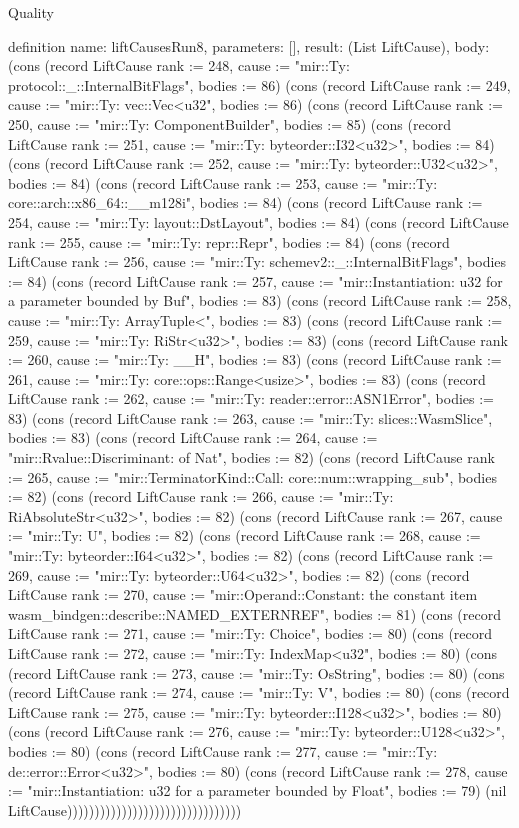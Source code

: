 \begin{lexlean}{Quality}
\begin{semanticmodule}
definition{
  name: liftCausesRun8,
  parameters: [],
  result: (List LiftCause),
  body: (cons (record LiftCause {rank := 248, cause := "mir::Ty: protocol::_::InternalBitFlags", bodies := 86}) (cons (record LiftCause {rank := 249, cause := "mir::Ty: vec::Vec<u32", bodies := 86}) (cons (record LiftCause {rank := 250, cause := "mir::Ty: ComponentBuilder", bodies := 85}) (cons (record LiftCause {rank := 251, cause := "mir::Ty: byteorder::I32<u32>", bodies := 84}) (cons (record LiftCause {rank := 252, cause := "mir::Ty: byteorder::U32<u32>", bodies := 84}) (cons (record LiftCause {rank := 253, cause := "mir::Ty: core::arch::x86_64::__m128i", bodies := 84}) (cons (record LiftCause {rank := 254, cause := "mir::Ty: layout::DstLayout", bodies := 84}) (cons (record LiftCause {rank := 255, cause := "mir::Ty: repr::Repr", bodies := 84}) (cons (record LiftCause {rank := 256, cause := "mir::Ty: schemev2::_::InternalBitFlags", bodies := 84}) (cons (record LiftCause {rank := 257, cause := "mir::Instantiation: u32 for a parameter bounded by Buf", bodies := 83}) (cons (record LiftCause {rank := 258, cause := "mir::Ty: ArrayTuple<", bodies := 83}) (cons (record LiftCause {rank := 259, cause := "mir::Ty: RiStr<u32>", bodies := 83}) (cons (record LiftCause {rank := 260, cause := "mir::Ty: __H", bodies := 83}) (cons (record LiftCause {rank := 261, cause := "mir::Ty: core::ops::Range<usize>", bodies := 83}) (cons (record LiftCause {rank := 262, cause := "mir::Ty: reader::error::ASN1Error", bodies := 83}) (cons (record LiftCause {rank := 263, cause := "mir::Ty: slices::WasmSlice", bodies := 83}) (cons (record LiftCause {rank := 264, cause := "mir::Rvalue::Discriminant: of Nat", bodies := 82}) (cons (record LiftCause {rank := 265, cause := "mir::TerminatorKind::Call: core::num::wrapping_sub", bodies := 82}) (cons (record LiftCause {rank := 266, cause := "mir::Ty: RiAbsoluteStr<u32>", bodies := 82}) (cons (record LiftCause {rank := 267, cause := "mir::Ty: U", bodies := 82}) (cons (record LiftCause {rank := 268, cause := "mir::Ty: byteorder::I64<u32>", bodies := 82}) (cons (record LiftCause {rank := 269, cause := "mir::Ty: byteorder::U64<u32>", bodies := 82}) (cons (record LiftCause {rank := 270, cause := "mir::Operand::Constant: the constant item wasm_bindgen::describe::NAMED_EXTERNREF", bodies := 81}) (cons (record LiftCause {rank := 271, cause := "mir::Ty: Choice", bodies := 80}) (cons (record LiftCause {rank := 272, cause := "mir::Ty: IndexMap<u32", bodies := 80}) (cons (record LiftCause {rank := 273, cause := "mir::Ty: OsString", bodies := 80}) (cons (record LiftCause {rank := 274, cause := "mir::Ty: V", bodies := 80}) (cons (record LiftCause {rank := 275, cause := "mir::Ty: byteorder::I128<u32>", bodies := 80}) (cons (record LiftCause {rank := 276, cause := "mir::Ty: byteorder::U128<u32>", bodies := 80}) (cons (record LiftCause {rank := 277, cause := "mir::Ty: de::error::Error<u32>", bodies := 80}) (cons (record LiftCause {rank := 278, cause := "mir::Instantiation: u32 for a parameter bounded by Float", bodies := 79}) (nil LiftCause))))))))))))))))))))))))))))))))
}


\end{semanticmodule}
\end{lexlean}

